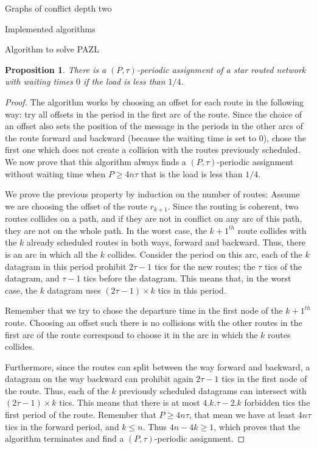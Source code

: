 \documentclass[10pt]{article}
\newtheorem{proposition}{Proposition}
\begin{document}
\begin{section}{Graphs of conflict depth two}
\begin{subsection}{Implemented algorithms}
\begin{subsubsection}{Algorithm to solve PAZL }
    \begin{proposition}
    There is a $(P,\tau)$-periodic assignment of a star routed network with waiting times $0$ if the load is less than $1/4$.
    \end{proposition}
    \begin{proof}
    The algorithm works by choosing an offset for each route in the following way: try all offsets in the period in the first arc of the route. Since the choice of an offset also sets the position of the message in the periods in the other arcs of the route forward and backward (because the waiting time is set to $0$), chose the first one which does not create a collision with the routes previously scheduled. We now prove that this algorithm always finds a $(P,\tau)$-periodic assignment without waiting time when $P \geq 4n\tau$ that is the load is less than $1/4$.
     
     We prove the previous property by induction on the number of routes: 
     Assume we are choosing the offset of the route $r_{k+1}$.
      Since the routing is coherent, two routes collides on a path, and if they are not in conflict on any arc of this path, they are not on the whole path.
     In the worst case, the $k+1^{th}$ route collides with the $k$ already scheduled routes in both ways, forward and backward. Thus, there is an arc in which all the $k$ collides. Consider the period on this arc, each of the $k$ datagram in this period prohibit $2\tau-1$ tics for the new routes; the $\tau$ tics of the datagram, and $\tau -1$ tics before the datagram. This means that, in the worst case, the $k$ datagram uses $(2\tau -1) \times k$ tics in this period.
     
     Remember that we try to chose the departure time in the first node of the $k+1^{th}$ route. Choosing an offset such there is no collisions with the other routes in the first arc of the route correspond to choose it in the arc in which the $k$ routes collides.
     
     Furthermore, since the routes can split between the way forward and backward, a datagram on the way backward can prohibit again $2\tau -1$ tics in the first node of the route. Thus, each of the $k$ previously scheduled datagrams can intersect with $(2\tau -1) \times k$ tics.
     This means that there is at most $4.k.\tau -2.k$ forbidden tics the first period of the route. Remember that $P \geq 4n\tau$, that mean we have at least $4n\tau$ tics in the forward period, and $k \leq n$. Thus $4n - 4k \geq 1$, which proves that the algorithm terminates and find a  $(P,\tau)$-periodic assignment. 
   

\end{proof}
\end{subsubsection}
\end{subsection}
\end{section}
\end{document}
